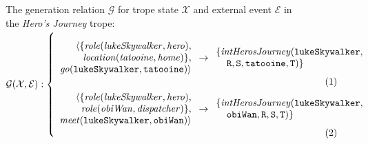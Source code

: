 \begin{figure*}[!t]
\small
The generation relation $\mathcal{G}$ for trope state $\mathcal{X}$ and external event $\mathcal{E}$ in the \emph{Hero's Journey} trope:\\ 
$\mathcal{G(X, E)}:\left\{\mbox{%
\begin{minipage}[c]{0.85\textwidth}
\begin{align}
\begin{array}{r}
\langle \{\mathit{role(lukeSkywalker, hero)},\\
\mathit{location(tatooine, home)}\},\\
\mathit{go}\mathtt{(lukeSkywalker, tatooine)} \rangle
\end{array}
&\rightarrow
\begin{array}{l}
\{\mathit{intHerosJourney}\mathtt{(lukeSkywalker,}\\\;\;\;\;\mathtt{R, S, tatooine, T)}\}
\end{array}\label{eq:tatooine}\\
\begin{array}{r}
                                 \langle \{\mathit{role(lukeSkywalker, hero)},\\
  \mathit{role(obiWan, dispatcher)}\},\\
\mathit{meet}\mathtt{(lukeSkywalker, obiWan)} \rangle
\end{array}
&\rightarrow
\begin{array}{l}
\{\mathit{intHerosJourney}\mathtt{(lukeSkywalker,}\\\;\;\;\;\mathtt{obiWan, R, S, T)}\}
\end{array}\label{eq:hsnth}
\end{align}
\end{minipage}
}\right.$\smallskip


\end{figure*}
